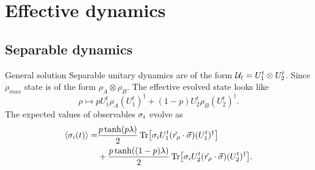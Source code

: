 \section{Effective dynamics}

\subsection{Separable dynamics}

\begin{frame}{General solution}
    Separable unitary dynamics are of the form $\mathcal{U}_{t}=U_{1}^{t}\otimes U_{2}^{t}$. Since $\rho_{max}$ state is of the form $\rho_{A}\otimes\rho_{B}$. The effective evolved state looks like
    \begin{equation*}
        \rho\mapsto pU_{1}^{t}\rho_{A}(U_{1}^{t})^{\dag}+(1-p)U_{2}^{t}\rho_{B} (U_{2}^{t})^{\dag}.
    \end{equation*}
    The expected values of observables $\sigma_{i}$ evolve as
    \begin{align*}
        \begin{split}
            \expval{\sigma_{i}(t)}=&\frac{p\tanh(p\lambda)}{2}\Tr[\sigma_{i}U_{1}^{t}(\hat{r_{\rho}}\cdot\vec{\sigma})(U_{1}^{t})^{\dag}]\\
        &+\frac{p\tanh((1-p)\lambda)}{2}\Tr[\sigma_{i}U_{2}^{t}(\hat{r_{\rho}}\cdot\vec{\sigma})(U_{2}^{t})^{\dag}].
        \end{split}
      \end{align*}
\end{frame}

